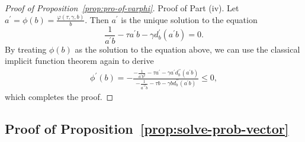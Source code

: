 \documentclass[11pt]{article}
\begin{document}
\begin{proof}[Proof of Proposition~\ref{prop:pro-of-varphi}]
    Proof of Part (iv). Let $a^\prime = \phi(b) = \frac{\varphi(\tau,\gamma,b)}{b}$. Then $a^\prime$ is the unique solution to the equation 
    \[
        \frac{1}{a^\prime b} - \tau a^\prime b -\gamma d_b^\prime(a^\prime b) = 0.
    \]
    By treating $\phi(b)$ as the solution to the equation above, we can use the classical implicit function theorem again to derive
    \begin{align*}
        \phi^\prime(b) = -\frac{-\frac{1}{a^\prime b^2}-\tau a^\prime -\gamma a^\prime d_b^{\prime\prime}(a^\prime b)}{-\frac{1}{{a^\prime}^2b}-\tau b - \gamma b d_b^{\prime\prime}(a^\prime b)} \leq 0,
    \end{align*}
    which completes the proof.
\end{proof}

\subsection{Proof of Proposition~\ref{prop:solve-prob-vector}}
\end{document}
